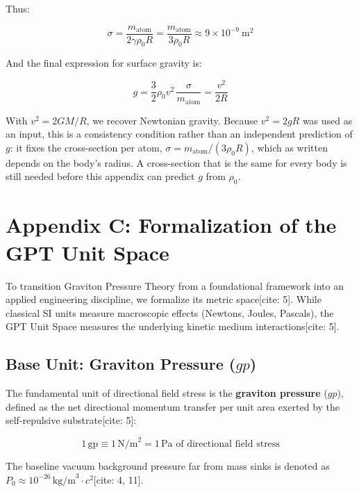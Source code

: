 \documentclass[12pt, a4paper]{article}
\begin{document}
Thus:

\[
\sigma = \frac{m_{\text{atom}}}{2\gamma \rho_0 R} = \frac{m_{\text{atom}}}{3 \rho_0 R} \approx 9 \times 10^{-9}\ \text{m}^2
\]

And the final expression for surface gravity is:

\[
g = \frac{3}{2}\rho_0 v^2 \, \frac{\sigma}{m_{\text{atom}}} = \frac{v^2}{2R}
\]

With \( v^2 = 2GM/R \), we recover Newtonian gravity. Because \( v^2 = 2gR \) was used as an input, this is a consistency condition rather than an independent prediction of \( g \): it fixes the cross-section per atom, \( \sigma = m_{\text{atom}}/(3\rho_0 R) \), which as written depends on the body's radius. A cross-section that is the same for every body is still needed before this appendix can predict \( g \) from \( \rho_0 \).


\section{Appendix C: Formalization of the GPT Unit Space}
\label{app:unit_space}

To transition Graviton Pressure Theory from a foundational framework into an applied engineering discipline, we formalize its metric space[cite: 5]. While classical SI units measure macroscopic effects (Newtons, Joules, Pascals), the GPT Unit Space measures the underlying kinetic medium interactions[cite: 5].

\subsection{Base Unit: Graviton Pressure ($gp$)}
The fundamental unit of directional field stress is the \textbf{graviton pressure} ($gp$), defined as the net directional momentum transfer per unit area exerted by the self-repulsive substrate[cite: 5]:

\begin{equation}
1\,\text{gp} \equiv 1\,\text{N/m}^2 = 1\,\text{Pa of directional field stress}
\end{equation}

The baseline vacuum background pressure far from mass sinks is denoted as $P_0 \approx 10^{-26}\,\text{kg/m}^3 \cdot c^2$[cite: 4, 11].
\end{document}
